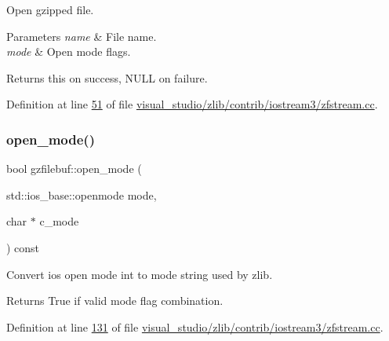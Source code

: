 Open gzipped file. 


\begin{DoxyParams}{Parameters}
{\em name} & File name. \\
\hline
{\em mode} & Open mode flags. \\
\hline
\end{DoxyParams}
\begin{DoxyReturn}{Returns}
{\ttfamily this} on success, N\+U\+LL on failure. 
\end{DoxyReturn}


Definition at line \hyperlink{visual__studio_2zlib_2contrib_2iostream3_2zfstream_8cc_source_l00051}{51} of file \hyperlink{visual__studio_2zlib_2contrib_2iostream3_2zfstream_8cc_source}{visual\+\_\+studio/zlib/contrib/iostream3/zfstream.\+cc}.

\mbox{\label{classgzfilebuf_ab0c2c304183e591706681af26add3da2}} 
\subsubsection{\texorpdfstring{open\+\_\+mode()}{open\_mode()}\hspace{0.1cm}{\footnotesize\ttfamily [1/2]}}
{\footnotesize\ttfamily bool gzfilebuf\+::open\+\_\+mode (\begin{DoxyParamCaption}\item[{std\+::ios\+\_\+base\+::openmode}]{mode,  }\item[{char $\ast$}]{c\+\_\+mode }\end{DoxyParamCaption}) const\hspace{0.3cm}{\ttfamily [protected]}}



Convert ios open mode int to mode string used by zlib. 

\begin{DoxyReturn}{Returns}
True if valid mode flag combination. 
\end{DoxyReturn}


Definition at line \hyperlink{visual__studio_2zlib_2contrib_2iostream3_2zfstream_8cc_source_l00131}{131} of file \hyperlink{visual__studio_2zlib_2contrib_2iostream3_2zfstream_8cc_source}{visual\+\_\+studio/zlib/contrib/iostream3/zfstream.\+cc}.

\mbox{\label{classgzfilebuf_ab0c2c304183e591706681af26add3da2}} 

